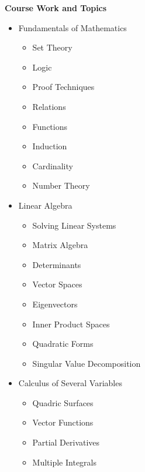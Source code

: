 \documentclass{article}
\begin{document}
\begin{addmargin}{2ex}

\textbf{Course Work and Topics}
  \begin{itemize}[labelindent=2ex, parsep=0ex, partopsep=0ex, topsep=-.7ex]
    \item Fundamentals of Mathematics
      \begin{multicols}{4}
        \begin{itemize}[labelindent=2ex, parsep=0ex, partopsep=0ex, topsep=-.7ex]
          \item Set Theory
          \item Logic
          \item Proof Techniques
          \item Relations
          \item Functions
          \item Induction
          \item Cardinality
          \item Number Theory
        \end{itemize}
      \end{multicols}
    \item Linear Algebra
      \begin{multicols}{3}
        \begin{itemize}
          \item Solving Linear Systems
          \item Matrix Algebra
          \item Determinants
          \item Vector Spaces
          \item Eigenvectors
          \item Inner Product Spaces
          \item Quadratic Forms
          \item Singular Value Decomposition
        \end{itemize}
      \end{multicols}
    \item Calculus of Several Variables
      \begin{multicols}{3}
        \begin{itemize}
          \item Quadric Surfaces
          \item Vector Functions
          \item Partial Derivatives
          \item Multiple Integrals

\end{itemize}
\end{multicols}
\end{itemize}
\end{addmargin}
\end{document}
